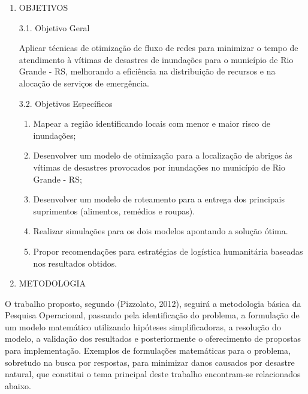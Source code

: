 \documentclass[
]{article}
\begin{document}
\begin{enumerate}
\def\labelenumi{\arabic{enumi}.}
\setcounter{enumi}{2}
\item
  OBJETIVOS

  3.1. Objetivo Geral

  Aplicar técnicas de otimização de fluxo de redes para minimizar o
  tempo de atendimento à vítimas de desastres de inundações para o
  município de Rio Grande - RS, melhorando a eficiência na distribuição
  de recursos e na alocação de serviços de emergência.

  3.2. Objetivos Específicos

  \begin{enumerate}
  \def\labelenumii{\arabic{enumii}.}
  \item
    Mapear a região identificando locais com menor e maior risco de
    inundações;
  \item
    Desenvolver um modelo de otimização para a localização de abrigos às
    vítimas de desastres provocados por inundações no município de Rio
    Grande - RS;
  \item
    Desenvolver um modelo de roteamento para a entrega dos principais
    suprimentos (alimentos, remédios e roupas).
  \item
    Realizar simulações para os dois modelos apontando a solução ótima.
  \item
    Propor recomendações para estratégias de logística humanitária
    baseadas nos resultados obtidos.
  \end{enumerate}
\item
  METODOLOGIA
\end{enumerate}

O trabalho proposto, segundo (Pizzolato, 2012), seguirá a metodologia
básica da Pesquisa Operacional, passando pela identificação do problema,
a formulação de um modelo matemático utilizando hipóteses
simplificadoras, a resolução do modelo, a validação dos resultados e
posteriormente o oferecimento de propostas para implementação. Exemplos
de formulações matemáticas para o problema, sobretudo na busca por
respostas, para minimizar danos causados por desastre natural, que
constitui o tema principal deste trabalho encontram-se relacionados
abaixo.
\end{document}

